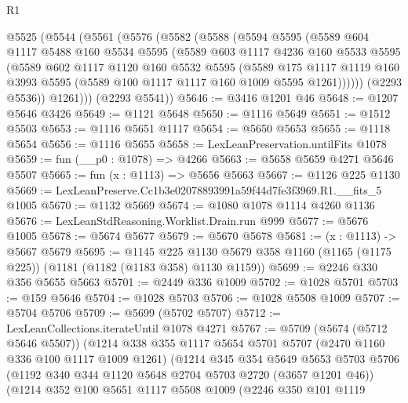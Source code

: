 \begin{lexlean}{R1}
\begin{coremodule}
  @5525
    (@5544
      (@5561
        (@5576
          (@5582
            (@5588
              (@5594
                @5595
                (@5589
                  @604
                  @1117
                  @5488
                  @160
                  @5534
                  @5595
                  (@5589
                    @603
                    @1117
                    @4236
                    @160
                    @5533
                    @5595
                    (@5589
                      @602
                      @1117
                      @1120
                      @160
                      @5532
                      @5595
                      (@5589
                        @175
                        @1117
                        @1119
                        @160
                        @3993
                        @5595
                        (@5589 @100 @1117 @1117 @160 @1009 @5595 @1261))))))
              (@2293 @5536))
            @1261)))
      (@2293 @5541))
@5646 := @3416 @1201 @46
@5648 := @1207 @5646 @3426
@5649 := @1121 @5648
@5650 := @1116 @5649
@5651 := @1512 @5503
@5653 := @1116 @5651 @1117
@5654 := @5650 @5653
@5655 := @1118 @5654
@5656 := @1116 @5655
@5658 := LexLeanPreservation.untilFits @1078
@5659 := fun (__p0 : @1078) => @4266
@5663 := @5658 @5659 @4271 @5646 @5507
@5665 := fun (x : @1113) => @5656 @5663
@5667 := @1126 @225 @1130
@5669 := LexLeanPreserve.Cc1b3e02078893991a59f44d7fe3f3969.R1.__fits_5 @1005
@5670 := @1132 @5669
@5674 := @1080 @1078 @1114 @4260 @1136
@5676 := LexLeanStdReasoning.Worklist.Drain.run @999
@5677 := @5676 @1005
@5678 := @5674 @5677
@5679 := @5670 @5678
@5681 := (x : @1113) -> @5667 @5679
@5695 := @1145
    @225
    @1130
    @5679
    @358
    @1160
    (@1165 (@1175 @225))
    (@1181 (@1182 (@1183 @358) @1130 @1159))
@5699 := @2246 @330 @356 @5655 @5663
@5701 := @2449 @336 @1009
@5702 := @1028 @5701
@5703 := @159 @5646
@5704 := @1028 @5703
@5706 := @1028 @5508 @1009
@5707 := @5704 @5706
@5709 := @5699 (@5702 @5707)
@5712 := LexLeanCollections.iterateUntil @1078 @4271
@5767 := @5709
    (@5674 (@5712 @5646 @5507))
    (@1214
      @338
      @355
      @1117
      @5654
      @5701
      @5707
      (@2470 @1160 @336 @100 @1117 @1009 @1261)
      (@1214
        @345
        @354
        @5649
        @5653
        @5703
        @5706
        (@1192 @340 @344 @1120 @5648 @2704 @5703 @2720 (@3657 @1201 @46))
        (@1214
          @352
          @100
          @5651
          @1117
          @5508
          @1009
          (@2246
            @350
            @101
            @1119

\end{coremodule}
\end{lexlean}

